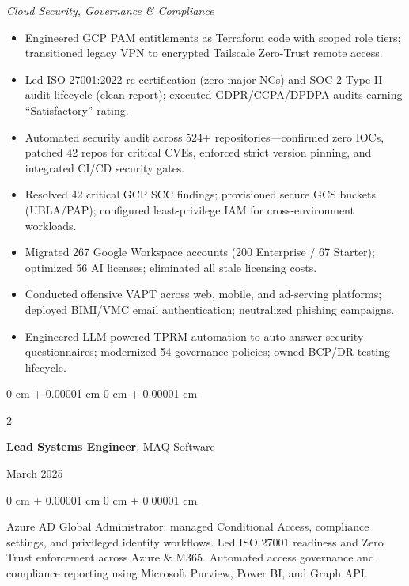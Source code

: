 \documentclass[10pt, letterpaper]{article}
\newenvironment{highlights}{
    \begin{itemize}[
        topsep=0.10 cm,
        parsep=0.10 cm,
        partopsep=0pt,
        itemsep=0pt,
        leftmargin=0 cm + 10pt
    ]
}{
    \end{itemize}
}
\newenvironment{onecolentry}{
    \begin{adjustwidth}{
        0 cm + 0.00001 cm
    }{
        0 cm + 0.00001 cm
    }
}{
    \end{adjustwidth}
}
\newenvironment{twocolentry}[2][]{
    \onecolentry
    \def\secondColumn{#2}
    \setcolumnwidth{\fill, 4.5 cm}
    \begin{paracol}{2}
}{
    \switchcolumn \raggedleft \secondColumn
    \end{paracol}
    \endonecolentry
}
\begin{document}
\vspace{0.10 cm}
\textit{Cloud Security, Governance \& Compliance}
\begin{highlights}
    \item Engineered GCP PAM entitlements as Terraform code with scoped role tiers; transitioned legacy VPN to encrypted Tailscale Zero-Trust remote access.
    \item Led ISO 27001:2022 re-certification (zero major NCs) and SOC 2 Type II audit lifecycle (clean report); executed GDPR/CCPA/DPDPA audits earning ``Satisfactory'' rating.
    \item Automated security audit across 524+ repositories—confirmed zero IOCs, patched 42 repos for critical CVEs, enforced strict version pinning, and integrated CI/CD security gates.
    \item Resolved 42 critical GCP SCC findings; provisioned secure GCS buckets (UBLA/PAP); configured least-privilege IAM for cross-environment workloads.
    \item Migrated 267 Google Workspace accounts (200 Enterprise / 67 Starter); optimized 56 AI licenses; eliminated all stale licensing costs.
    \item Conducted offensive VAPT across web, mobile, and ad-serving platforms; deployed BIMI/VMC email authentication; neutralized phishing campaigns.
    \item Engineered LLM-powered TPRM automation to auto-answer security questionnaires; modernized 54 governance policies; owned BCP/DR testing lifecycle.
\end{highlights}

\vspace{0.2 cm}

\begin{twocolentry}{March 2025}
    \textbf{Lead Systems Engineer}, \href{https://maqsoftware.com/}{MAQ Software}
\end{twocolentry}

\vspace{0.10 cm}
\begin{onecolentry}
    Azure AD Global Administrator: managed Conditional Access, compliance settings, and privileged identity workflows. Led ISO 27001 readiness and Zero Trust enforcement across Azure \& M365. Automated access governance and compliance reporting using Microsoft Purview, Power BI, and Graph API.
\end{onecolentry}

\vspace{0.2 cm}
\end{document}
